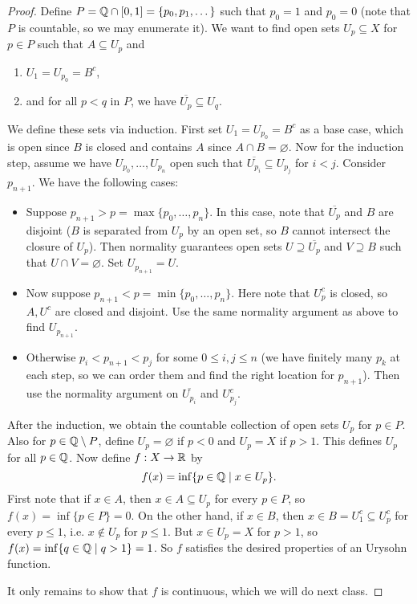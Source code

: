 \begin{proof}
  Define $P = \mathbb{Q} \cap [0, 1] = \{p_0, p_1, \dots\}$
  such that $p_0 = 1$ and $p_0 = 0$ (note that
  $P$ is countable, so we may enumerate it).
  We want to find open sets $U_p \subseteq X$
  for $p \in P$ such that $A \subseteq U_p$ and
  \begin{enumerate}
    \item $U_1 = U_{p_0} = B^c$,
    \item and for all $p < q$ in $P$, we have
      $\overline{U_p} \subseteq U_q$.
  \end{enumerate}
  We define these sets via induction. First
  set $U_1 = U_{p_0} = B^c$ as a base case, which
  is open since $B$ is closed and contains $A$
  since $A \cap B = \varnothing$. Now
  for the induction step, assume we have
  $U_{p_0}, \dots, U_{p_n}$ open such that
  $\overline{U_{p_i}} \subseteq U_{p_j}$
  for $i < j$. Consider $p_{n + 1}$. We have
  the following cases:
  \begin{itemize}
    \item Suppose $p_{n + 1} > p = \max\{p_0, \dots, p_n\}$.
      In this case, note that
      $\overline{U_p}$ and $B$ are disjoint
      ($B$ is separated from $U_p$ by an open set,
      so $B$ cannot intersect the closure of $U_p$).
      Then normality guarantees open sets
      $U \supseteq \overline{U_p}$ and
      $V \supseteq B$ such that $U \cap V = \varnothing$.
      Set $U_{p_{n + 1}} = U$.
    \item Now suppose $p_{n + 1} < p = \min\{p_0, \dots, p_n\}$.
      Here note that $U_p^c$ is closed, so
      $A, U^c$ are closed and disjoint. Use the
      same normality argument as above to find
      $U_{p_{n + 1}}$.
    \item Otherwise $p_i < p_{n + 1} < p_j$
      for some $0 \le i, j \le n$ (we have finitely
      many $p_k$ at each step, so we can order them
      and find the right location for $p_{n + 1}$).
      Then use the normality argument on
      $\overline{U_{p_i}}$ and $U_{p_j}^c$.
  \end{itemize}
  After the induction, we obtain the countable
  collection of open sets $U_p$ for $p \in P$.
  Also for $p \in \mathbb{Q} \setminus P$, define
  $U_p = \varnothing$
  if $p < 0$ and $U_p = X$ if $p > 1$. This
  defines $U_p$ for all $p \in \mathbb{Q}$. Now define
  $f : X \to \mathbb{R}$ by
  \[
    f(x) = \inf\{p \in \mathbb{Q} \mid x \in U_p\}.
  \]
  First note that if $x \in A$, then
  $x \in A \subseteq U_p$ for every $p \in P$,
  so $f(x) = \inf\{p \in P\} = 0$.
  On the other hand, if $x \in B$, then
  $x \in B = U_1^c \subseteq U_p^c$ for every
  $p \le 1$, i.e. $x \notin U_p$ for $p \le 1$.
  But $x \in U_p = X$ for $p > 1$, so
  $f(x) = \inf\{q \in \mathbb{Q} \mid q > 1\} = 1$.
  So $f$ satisfies the desired properties of an
  Urysohn function.

  It only remains to show that $f$ is continuous,
  which we will do next class.
\end{proof}
